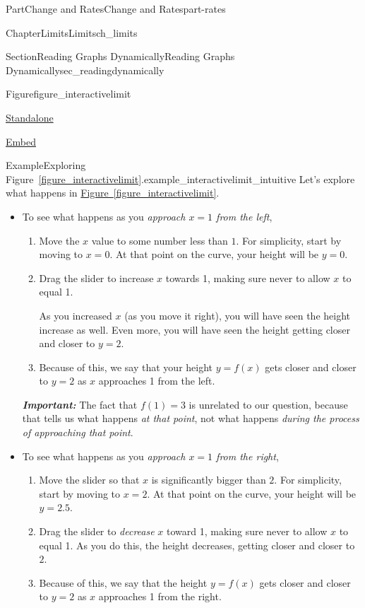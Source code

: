 \documentclass{tufte-book}
\newcommand{\xreffont}{\relax}
\newcommand{\alert}[1]{\textbf{\textit{#1}}}
\numberwithin{equation}{chapter}
\begin{document}
\begin{partptx}{Part}{Change and Rates}{}{Change and Rates}{}{}{part-rates}
\begin{chapterptx}{Chapter}{Limits}{}{Limits}{}{}{ch_limits}
\begin{sectionptx}{Section}{Reading Graphs Dynamically}{}{Reading Graphs Dynamically}{}{}{sec_readingdynamically}
\begin{figureptx}{Figure}{}{figure_interactivelimit}{}
\begin{sidebyside}{2}{0.075}{0.075}{0.17}
\begin{sbspanel}{0.21}
\href{http://webwork.bridgew.edu/oer/functions_at_work/figure_interactivelimit-2.html}{Standalone}%
\par
\href{http://webwork.bridgew.edu/oer/functions_at_work/figure_interactivelimit-2-if.html}{Embed}%
\end{sbspanel}%
\end{sidebyside}%
\tcblower
\end{figureptx}%
\begin{example}{Example}{Exploring Figure~{\xreffont\ref*{figure_interactivelimit}}.}{example_interactivelimit_intuitive}%
Let's explore what happens in  \hyperref[figure_interactivelimit]{Figure~{\xreffont\ref{figure_interactivelimit}}}.%
%
\begin{itemize}[label=\textbullet]
\item{}To see what happens as you \emph{approach \(x=1\) from the left},%
\begin{enumerate}
\item{}Move the \(x\) value to some number less than \(1\). For simplicity, start by moving to \(x=0\). At that point on the curve, your height will be \(y=0\).%
\item{}Drag the slider to increase \(x\) towards 1, making sure never to allow \(x\) to equal 1.%
\par
As you increased \(x\) (as you move it right), you will have seen the height increase as well.  Even more, you will have seen the height getting closer and closer to \(y=2\).%
\item{}Because of this, we say that your height \(y=f(x)\) gets closer and closer to \(y=2\) as \(x\) approaches 1 from the left.%
\end{enumerate}
%
\par
\alert{Important:} The fact that \(f(1)=3\) is unrelated to our question, because that tells us what happens \emph{at that point}, not what happens \emph{during the process of approaching that point}.%
\item{}To see what happens as you \emph{approach \(x=1\) from the right},%
\begin{enumerate}
\item{}Move the slider so that \(x\) is significantly bigger than \(2\). For simplicity, start by moving to \(x=2\). At that point on the curve, your height will be \(y=2.5\).%
\item{}Drag the slider to \emph{decrease} \(x\) toward 1, making sure never to allow \(x\) to equal 1. As you do this, the height decreases, getting closer and closer to \(2\).%
\item{}Because of this, we say that the height \(y=f(x)\) gets closer and closer to \(y=2\) as \(x\) approaches 1 from the right.%

\end{enumerate}
\end{itemize}
\end{example}
\end{sectionptx}
\end{chapterptx}
\end{partptx}
\end{document}
